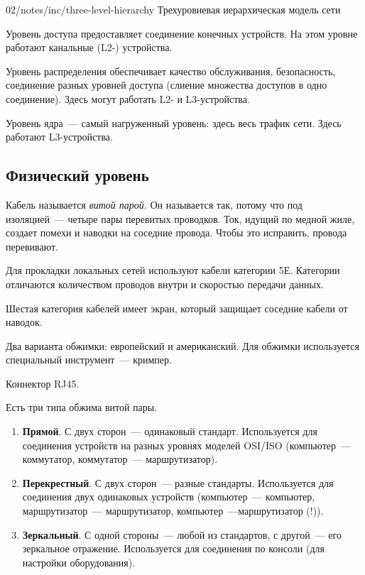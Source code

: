 \image
{\textwidth}
{02/notes/inc/three-level-hierarchy}
{Трехуровневая иерархическая модель сети}

Уровень доступа предоставляет соединение конечных устройств. На этом уровне работают канальные (L2-) устройства.

Уровень распределения обеспечивает качество обслуживания, безопасность, соединение разных уровней доступа (слиение множества доступов в одно соединение). Здесь могут работать L2- и L3-устройства.

Уровень ядра~--- самый нагруженный уровень: здесь весь трафик сети. Здесь работают L3-устройства.

\subsection{Физический уровень}

Кабель называется \textit{витой парой}. Он называется так, потому что под изоляцией~--- четыре пары перевитых проводков. Ток, идущий по медной жиле, создает помехи и наводки на соседние провода. Чтобы это исправить, провода перевивают.

Для прокладки локальных сетей используют кабели категории 5Е. Категории отличаются количеством проводов внутри и скоростью передачи данных.

Шестая категория кабелей имеет экран, который защищает соседние кабели от наводок.

Два варианта обжимки: европейский и американский. Для обжимки используется специальный инструмент~--- кримпер.

Коннектор RJ45.

Есть три типа обжима витой пары.

\begin{enumerate}
    \item \textbf{Прямой}. С двух сторон~--- одинаковый стандарт. Используется для соединения устройств на разных уровнях моделей OSI/ISO (компьютер~--- коммутатор, коммутатор~--- маршрутизатор).
    \item \textbf{Перекрестный}. С двух сторон~--- разные стандарты. Используется для соединения двух одинаковых устройств (компьютер~--- компьютер, маршрутизатор~--- маршрутизатор, компьютер~---маршрутизатор (!)).
    \item \textbf{Зеркальный}. С одной стороны~--- любой из стандартов, с другой~--- его зеркальное отражение. Используется для соединения по консоли (для настройки оборудования).
\end{enumerate}

